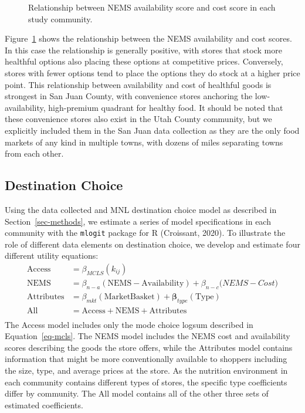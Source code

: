 \documentclass[
  letterpaper,
  number,
  review,
  3p]{elsarticle}
\begin{document}
\begin{figure}


\caption{\label{fig-nems-cost-avail}Relationship between NEMS
availability score and cost score in each study community.}

\end{figure}%

Figure~\ref{fig-nems-cost-avail} shows the relationship between the NEMS
availability and cost scores. In this case the relationship is generally
positive, with stores that stock more healthful options also placing
these options at competitive prices. Conversely, stores with fewer
options tend to place the options they do stock at a higher price point.
This relationship between availability and cost of healthful goods is
strongest in San Juan County, with convenience stores anchoring the
low-availability, high-premium quadrant for healthy food. It should be
noted that these convenience stores also exist in the Utah County
community, but we explicitly included them in the San Juan data
collection as they are the only food markets of any kind in multiple
towns, with dozens of miles separating towns from each other.

\subsection{Destination Choice}\label{sec-estimation}

Using the data collected and MNL destination choice model as described
in Section~\ref{sec-methods}, we estimate a series of model
specifications in each community with the \texttt{mlogit} package for R
(Croissant, 2020). To illustrate the role of different data elements on
destination choice, we develop and estimate four different utility
equations: \begin{align*}
\mathrm{Access} &= \beta_{MCLS}( k_{ij})\\
\mathrm{NEMS} &= \beta_{n-a} (\mathrm{NEMS-Availability}) + \beta_{n-c}\mathrm({NEMS-Cost})\\
\mathrm{Attributes} &= \beta_{mkt} (\mathrm{Market Basket}) + \mathbf{\beta}_{type}(\mathrm{Type})\\
\mathrm{All} &= \mathrm{Access} + \mathrm{NEMS} + \mathrm{Attributes}\\
\end{align*} The Access model includes only the mode choice logsum
described in Equation~\ref{eq-mcls}. The NEMS model includes the NEMS
cost and availability scores describing the goods the store offers,
while the Attributes model contains information that might be more
conventionally available to shoppers including the size, type, and
average prices at the store. As the nutrition environment in each
community contains different types of stores, the specific type
coefficients differ by community. The All model contains all of the
other three sets of estimated coefficients.
\end{document}
